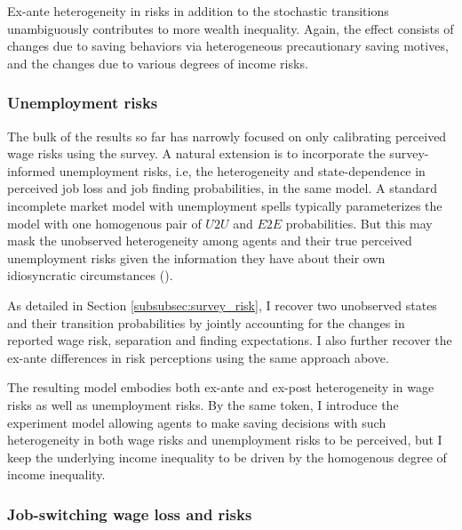 Ex-ante heterogeneity in risks in addition to the stochastic transitions unambiguously contributes to more wealth inequality. Again, the effect consists of changes due to saving behaviors via heterogeneous precautionary saving motives, and the changes due to various degrees of income risks. 

\subsubsection{Unemployment risks}

The bulk of the results so far has narrowly focused on only calibrating perceived wage risks using the survey. A natural extension is to incorporate the survey-informed unemployment risks, i.e, the heterogeneity and state-dependence in perceived job loss and job finding probabilities, in the same model. A standard incomplete market model with unemployment spells typically parameterizes the model with one homogenous pair of $U2U$ and $E2E$ probabilities. But this may mask the unobserved heterogeneity among agents and their true perceived unemployment risks given the information they have about their own idiosyncratic circumstances (\cite{mueller2021expectations}).  

As detailed in Section \ref{subsubsec:survey_risk}, I recover two unobserved states and their transition probabilities by jointly accounting for the changes in reported wage risk, separation and finding expectations. I also further recover the ex-ante differences in risk perceptions using the same approach above. 

The resulting model embodies both ex-ante and ex-post heterogeneity in wage risks as well as unemployment risks. By the same token, I introduce the experiment model allowing agents to make saving decisions with such heterogeneity in both wage risks and unemployment risks to be perceived, but I keep the underlying income inequality to be driven by the homogenous degree of income inequality. 

\subsubsection{Job-switching wage loss and risks}

